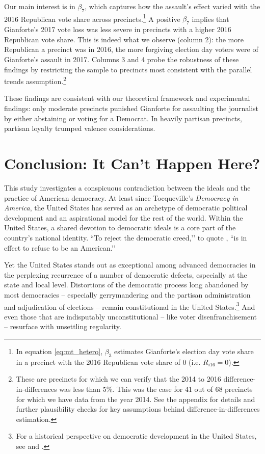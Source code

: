 \documentclass[letterpaper, 12pt]{article}
\begin{document}
\begin{raggedright}
Our main interest is in $\beta_7$, which captures how the assault's effect varied with the 2016 Republican vote share across precincts.\footnote{In equation \eqref{eq:mt_hetero}, $\beta_3$ estimates Gianforte's election day vote share in a precinct with the 2016 Republican vote share of 0 (i.e. $R_{i16}=0$).} A positive $\beta_7$ implies that Gianforte's 2017 vote loss was less severe in precincts with a higher 2016 Republican vote share. This is indeed what we observe (column 2): the more Republican a precinct was in 2016, the more forgiving election day voters were of Gianforte's assault in 2017. Columns 3 and 4 probe the robustness of these findings by restricting the sample to precincts most consistent with the parallel trends assumption.\footnote{These are precincts for which we can verify that the 2014 to 2016 difference-in-differences was less than 5\%. This was the case for 41 out of 68 precincts for which we have data from the year 2014. See the appendix for details and further plausibility checks for key assumptions behind difference-in-differences estimation.}

These findings are consistent with our theoretical framework and experimental findings: only moderate precincts punished Gianforte for assaulting the journalist by either abstaining or voting for a Democrat. In heavily partisan precincts, partisan loyalty trumped valence considerations.

\afterpage{\clearpage}


\section{Conclusion: It Can't Happen Here?}
\label{sec: conclusion}

This study investigates a conspicuous contradiction between the ideals and the practice of American democracy. At least since Tocqueville's \emph{Democracy in America}, the United States has served as an archetype of democratic political development and an aspirational model for the rest of the world. Within the United States, a shared devotion to democratic ideals is a core part of the country's national identity. ``To reject the democratic creed,’’ to quote \citet[317]{Dahl1961}, ``is in effect to refuse to be an American.’’


Yet the United States stands out as exceptional among advanced democracies in the perplexing recurrence of a number of democratic defects, especially at the state and local level. Distortions of the democratic process long abandoned by most democracies -- especially gerrymandering and the partisan administration and adjudication of elections -- remain constitutional in the United States.\footnote{For a historical perspective on democratic development in the United States, see \citet{Bateman2018} and \citet{Mickey2015}.} And even those that are indisputably unconstitutional – like voter disenfranchisement – resurface with unsettling regularity.



\end{raggedright}
\end{document}
